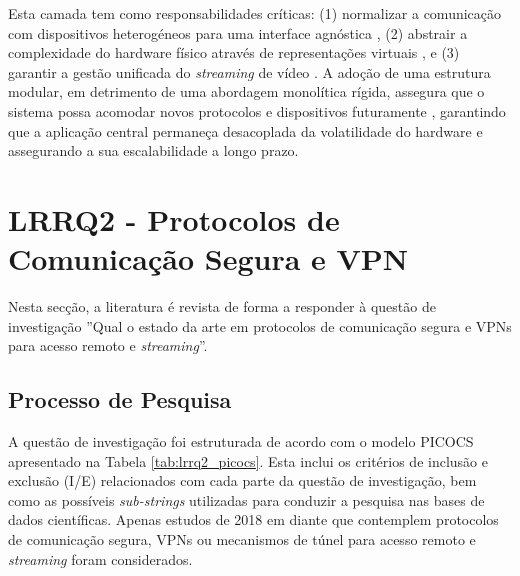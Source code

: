 Esta camada tem como responsabilidades críticas: (1) normalizar a comunicação com dispositivos heterogéneos para uma interface agnóstica \cite{barros_iot_2019,mesmoudi_design_2018}, (2) abstrair a complexidade do hardware físico através de representações virtuais \cite{mafamane_study_2021}, e (3) garantir a gestão unificada do \textit{streaming} de vídeo \cite{schwarzer_ial_2021}. A adoção de uma estrutura modular, em detrimento de uma abordagem monolítica rígida, assegura que o sistema possa acomodar novos protocolos e dispositivos futuramente \cite{dobaj_microservice_2018}, garantindo que a aplicação central permaneça desacoplada da volatilidade do hardware e assegurando a sua escalabilidade a longo prazo.


\section{LRRQ2 - Protocolos de Comunicação Segura e VPN}
\label{sec:lrrq2_vpn}

Nesta secção, a literatura é revista de forma a responder à questão de investigação ''Qual o estado da arte em protocolos de comunicação segura e \glspl{VPN} para acesso remoto e \textit{streaming}''.

\subsection{Processo de Pesquisa}

A questão de investigação foi estruturada de acordo com o modelo PICOCS apresentado na Tabela \ref{tab:lrrq2_picocs}.
Esta inclui os critérios de inclusão e exclusão (I/E) relacionados com cada parte da questão de investigação, bem como as possíveis \textit{sub-strings} utilizadas para conduzir a pesquisa nas bases de dados científicas. Apenas estudos de 2018 em diante que contemplem protocolos de comunicação segura, \glspl{VPN} ou mecanismos de túnel para acesso remoto e \textit{streaming} foram considerados.

